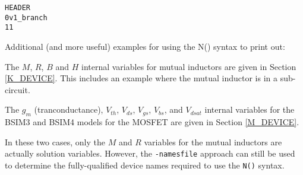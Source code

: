 \begin{alltt}
HEADER
	0	   v1_branch
	1	           1
\end{alltt}
Additional (and more useful) examples for using the N() syntax to print out:
\begin{XyceItemize}
\item The $M$, $R$, $B$ and $H$ internal variables for mutual inductors are given in Section
   \ref{K_DEVICE}.  This includes an example where the mutual inductor is in a sub-circuit.
\item The $g_{m}$ (tranconductance), $V_{th}$, $V_{ds}$, $V_{gs}$, $V_{bs}$, and $V_{dsat}$ 
   internal variables for the BSIM3 and BSIM4 models for the MOSFET are given in 
   Section \ref{M_DEVICE}.
\end{XyceItemize}
In these two cases, only the $M$ and $R$ variables for the mutual inductors are
actually solution variables.  However, the {\tt -namesfile} approach can still be
used to determine the fully-qualified \Xyce{} device names required to use the {\tt N()}
syntax.


